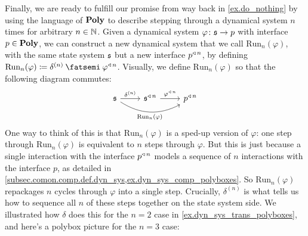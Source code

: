 \documentclass[Book-Poly]{subfiles}
\begin{document}
Finally, we are ready to fulfill our promise from way back in \cref{ex.do_nothing} by using the language of $\mathbf{Poly}$ to describe stepping through a dynamical system $n$ times for arbitrary $n\in\mathbb{N}$.
Given a dynamical system $\varphi\colon\mathfrak{s}\to p$ with interface $p\in\mathbf{Poly}$, we can construct a new dynamical system that we call $\text{Run}_n(\varphi)$, with the same state system $\mathfrak{s}$ but a new interface $p^{\mathbin{\triangleleft}\,n}$, by defining $\text{Run}_n(\varphi)\coloneqq\delta^{(n)}\then\varphi\tripow{n}$.
Visually, we define $\text{Run}_n(\varphi)$ so that the following diagram commutes:
\begin{equation}\label{eqn.speedup}
\begin{tikzcd}
	\car{s}\ar[r, "\delta^{(n)}"]\ar[rr, bend right, "{\text{Run}_n(\varphi)}"']&
	\car{s}\tripow{n}\ar[r, "\varphi\tripow{n}"]&
	p\tripow n
\end{tikzcd}
\end{equation}
One way to think of this is that $\text{Run}_n(\varphi)$ is a sped-up version of $\varphi$: one step through $\text{Run}_n(\varphi)$ is equivalent to $n$ steps through $\varphi$.
But this is just because a single interaction with the interface $p^{\mathbin{\triangleleft}\,n}$ models a sequence of $n$ interactions with the interface $p$, as detailed in \cref{subsec.comon.comp.def.dyn_sys,ex.dyn_sys_comp_polyboxes}.
So $\text{Run}_n(\varphi)$ repackages $n$ cycles through $\varphi$ into a single step.
Crucially, $\delta^{(n)}$ is what tells us how to sequence all $n$ of these steps together on the state system side.
We illustrated how $\delta$ does this for the $n=2$ case in \cref{ex.dyn_sys_trans_polyboxes}, and here's a polybox picture for the $n=3$ case:
\end{document}
